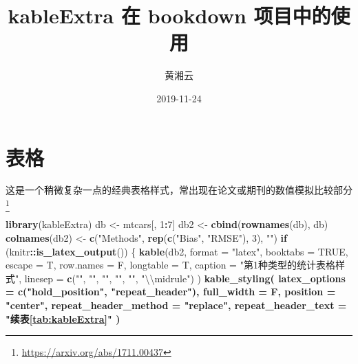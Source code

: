 \documentclass[]{book}
\title{kableExtra 在 bookdown 项目中的使用}
\author{黄湘云}
\date{2019-11-24}
\newenvironment{Shaded}{\begin{snugshade}}{\end{snugshade}}
\newcommand{\CharTok}[1]{\textcolor[rgb]{0.31,0.60,0.02}{#1}}
\newcommand{\ControlFlowTok}[1]{\textcolor[rgb]{0.13,0.29,0.53}{\textbf{#1}}}
\newcommand{\DataTypeTok}[1]{\textcolor[rgb]{0.13,0.29,0.53}{#1}}
\newcommand{\DecValTok}[1]{\textcolor[rgb]{0.00,0.00,0.81}{#1}}
\newcommand{\KeywordTok}[1]{\textcolor[rgb]{0.13,0.29,0.53}{\textbf{#1}}}
\newcommand{\NormalTok}[1]{#1}
\newcommand{\OperatorTok}[1]{\textcolor[rgb]{0.81,0.36,0.00}{\textbf{#1}}}
\newcommand{\OtherTok}[1]{\textcolor[rgb]{0.56,0.35,0.01}{#1}}
\newcommand{\StringTok}[1]{\textcolor[rgb]{0.31,0.60,0.02}{#1}}
\begin{document}
\maketitle

{
\hypersetup{linkcolor=}
\setcounter{tocdepth}{1}
\tableofcontents
}
\hypertarget{table}{%
\chapter{表格}\label{table}}

这是一个稍微复杂一点的经典表格样式，常出现在论文或期刊的数值模拟比较部分\footnote{\url{https://arxiv.org/abs/1711.00437}}

\begin{Shaded}
\begin{Highlighting}[]
\KeywordTok{library}\NormalTok{(kableExtra)}
\NormalTok{db <-}\StringTok{ }\NormalTok{mtcars[, }\DecValTok{1}\OperatorTok{:}\DecValTok{7}\NormalTok{]}
\NormalTok{db2 <-}\StringTok{ }\KeywordTok{cbind}\NormalTok{(}\KeywordTok{rownames}\NormalTok{(db), db)}
\KeywordTok{colnames}\NormalTok{(db2) <-}\StringTok{ }\KeywordTok{c}\NormalTok{(}\StringTok{"Methods"}\NormalTok{, }\KeywordTok{rep}\NormalTok{(}\KeywordTok{c}\NormalTok{(}\StringTok{"Bias"}\NormalTok{, }\StringTok{"RMSE"}\NormalTok{), }\DecValTok{3}\NormalTok{), }\StringTok{""}\NormalTok{)}
\ControlFlowTok{if}\NormalTok{ (knitr}\OperatorTok{::}\KeywordTok{is_latex_output}\NormalTok{()) \{}
  \KeywordTok{kable}\NormalTok{(db2,}
    \DataTypeTok{format =} \StringTok{"latex"}\NormalTok{, }\DataTypeTok{booktabs =} \OtherTok{TRUE}\NormalTok{, }\DataTypeTok{escape =}\NormalTok{ T, }\DataTypeTok{row.names =}\NormalTok{ F,}
    \DataTypeTok{longtable =}\NormalTok{ T, }\DataTypeTok{caption =} \StringTok{"第1种类型的统计表格样式"}\NormalTok{,}
    \DataTypeTok{linesep =} \KeywordTok{c}\NormalTok{(}\StringTok{""}\NormalTok{, }\StringTok{""}\NormalTok{, }\StringTok{""}\NormalTok{, }\StringTok{""}\NormalTok{, }\StringTok{""}\NormalTok{, }\StringTok{"}\CharTok{\textbackslash{}\textbackslash{}}\StringTok{midrule"}\NormalTok{)}
\NormalTok{  ) }\OperatorTok{%>%}
\StringTok{    }\KeywordTok{kable_styling}\NormalTok{(}
      \DataTypeTok{latex_options =} \KeywordTok{c}\NormalTok{(}\StringTok{"hold_position"}\NormalTok{, }\StringTok{"repeat_header"}\NormalTok{),}
      \DataTypeTok{full_width =}\NormalTok{ F, }\DataTypeTok{position =} \StringTok{"center"}\NormalTok{, }\DataTypeTok{repeat_header_method =} \StringTok{"replace"}\NormalTok{,}
      \DataTypeTok{repeat_header_text =} \StringTok{"续表\ref{tab:kableExtra}"}
\NormalTok{    ) }\OperatorTok{%>%}
}}
\end{Highlighting}
\end{Shaded}
\end{document}
